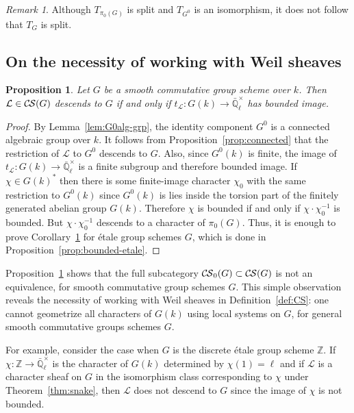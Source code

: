 \documentclass[10pt]{amsart}
\theoremstyle{plain}
\newtheorem{proposition}[theorem]{Proposition}
\theoremstyle{definition}
\theoremstyle{remark}
\newtheorem{remark}[theorem]{Remark}
\newcommand{\ZZ}{{\mathbb{Z}}}
\newcommand{\EE}{\mathbb{\bar Q}_\ell}
\newcommand{\Fq}{k}
\newcommand{\EEx}{\EE^\times}
\newcommand{\trFrob}[1]{t_{#1}}
\newcommand{\TrFrob}[1]{T_{#1}}
\newcommand{\cs}[1]{{\mathcal{#1}}}
\newcommand{\CS}{{\mathcal{C\hskip-0.8pt S}}}
\newcommand{\bCS}{{\CS_0}}
\begin{document}
\begin{remark}
Although $\TrFrob{\pi_0(G)}$ is split and $\TrFrob{G^0}$ is an isomorphism, it does not follow that $\TrFrob{G}$ is split. 
\end{remark}


\subsection{On the necessity of working with Weil sheaves}

\begin{proposition} \label{prop:bounded}
Let $G$ be a smooth commutative group scheme over $\Fq$. 
Then $\cs{L}\in \CS(G)$ descends to $G$ if and only if $\trFrob{\cs{L}} : G(\Fq) \to \EEx$ has bounded image.
\end{proposition}
\begin{proof} 
By Lemma~\ref{lem:G0alg-grp}, the identity component $G^0$ is a connected algebraic group over $\Fq$. 
It follows from Proposition~\ref{prop:connected} that the restriction of $\cs{L}$ to $G^0$ descends to $G$. 
Also, since $G^0(\Fq)$ is finite, the image of $\trFrob{\cs{L}} : G(\Fq) \to \EEx$ is a finite subgroup and therefore bounded image.  
%
If $\chi \in G(\Fq)^*$ then there is some finite-image character $\chi_0$
with the same restriction to $G^0(\Fq)$ since $G^0(\Fq)$ is lies inside the torsion part of
the finitely generated abelian group $G(\Fq)$.  Therefore $\chi$ is bounded 
if and only if $\chi \cdot \chi_0^{-1}$ is bounded.  But $\chi \cdot \chi_0^{-1}$ descends
to a character of $\pi_0(G)$.
Thus, it is enough to prove Corollary~\ref{prop:bounded}
for \'etale group schemes $G$, which is done in Proposition~\ref{prop:bounded-etale}.
\end{proof}

Proposition~\ref{prop:bounded} shows that the full subcategory
$\bCS(G) \subset \CS(G)$ is not an equivalence, for smooth commutative group schemes $G$.
This simple observation reveals the necessity of working with Weil sheaves in Definition~\ref{def:CS}: one cannot geometrize all characters of $G(\Fq)$ using local systems on $G$, for general smooth commutative groups schemes $G$. 

For example, consider the case when $G$ is the discrete \'etale group scheme $\ZZ$.
If $\chi : \ZZ \to \EEx$ is the character of $G(\Fq)$ determined by $\chi(1) = \ell$
and if $\cs{L}$ is a character sheaf on $G$ in the isomorphism class
corresponding to $\chi$ under Theorem~\ref{thm:snake},
then $\cs{L}$ does not descend to $G$ since the image of $\chi$ is not
bounded.
\end{document}
